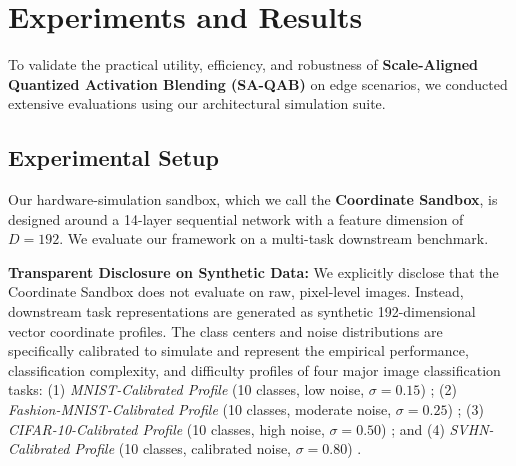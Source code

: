 \section{Experiments and Results}
\label{sec:experiments}

To validate the practical utility, efficiency, and robustness of \textbf{Scale-Aligned Quantized Activation Blending (SA-QAB)} on edge scenarios, we conducted extensive evaluations using our architectural simulation suite.

\subsection{Experimental Setup}
Our hardware-simulation sandbox, which we call the \textbf{Coordinate Sandbox}, is designed around a 14-layer sequential network with a feature dimension of $D = 192$. We evaluate our framework on a multi-task downstream benchmark. 

\textbf{Transparent Disclosure on Synthetic Data:} We explicitly disclose that the Coordinate Sandbox does not evaluate on raw, pixel-level images. Instead, downstream task representations are generated as synthetic 192-dimensional vector coordinate profiles. The class centers and noise distributions are specifically calibrated to simulate and represent the empirical performance, classification complexity, and difficulty profiles of four major image classification tasks: (1) \emph{MNIST-Calibrated Profile} (10 classes, low noise, $\sigma = 0.15$) \cite{lecun1998gradient}; (2) \emph{Fashion-MNIST-Calibrated Profile} (10 classes, moderate noise, $\sigma = 0.25$) \cite{xiao2017fashion}; (3) \emph{CIFAR-10-Calibrated Profile} (10 classes, high noise, $\sigma = 0.50$) \cite{krizhevsky2009learning}; and (4) \emph{SVHN-Calibrated Profile} (10 classes, calibrated noise, $\sigma = 0.80$) \cite{netzer2011reading}.

